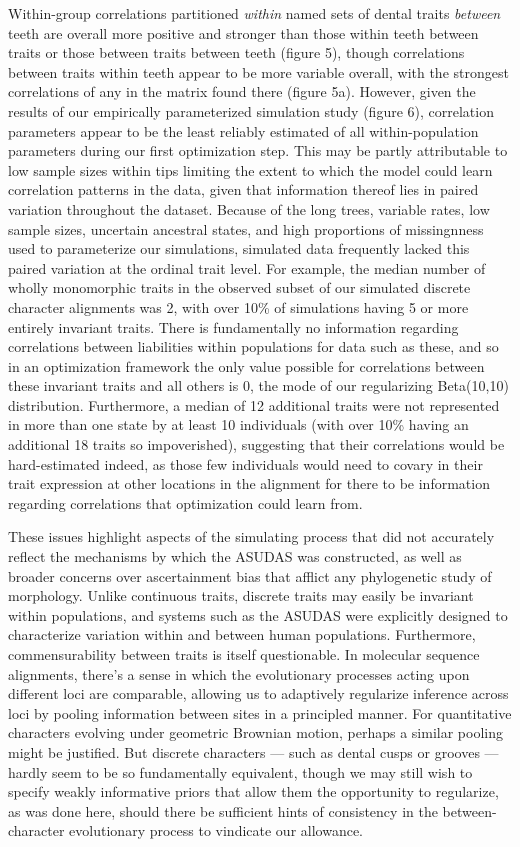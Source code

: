 \documentclass[12pt, twocolumn, twoside]{article}
\begin{document}
Within-group correlations partitioned \textit{within} named sets of dental traits \textit{between} teeth are overall more positive and stronger than those within teeth between traits or those between traits between teeth (figure 5), though correlations between traits within teeth appear to be more variable overall, with the strongest correlations of any in the matrix found there (figure 5a). However, given the results of our empirically parameterized simulation study (figure 6), correlation parameters appear to be the least reliably estimated of all within-population parameters during our first optimization step. This may be partly attributable to low sample sizes within tips limiting the extent to which the model could learn correlation patterns in the data, given that information thereof lies in paired variation throughout the dataset. Because of the long trees, variable rates, low sample sizes, uncertain ancestral states, and high proportions of missingnness used to parameterize our simulations, simulated data frequently lacked this paired variation at the ordinal trait level. For example, the median number of wholly monomorphic traits in the observed subset of our simulated discrete character alignments was 2, with over 10\% of simulations having 5 or more entirely invariant traits. There is fundamentally no information regarding correlations between liabilities within populations for data such as these, and so in an optimization framework the only value possible for correlations between these invariant traits and all others is 0, the mode of our regularizing Beta(10,10) distribution. Furthermore, a median of 12 additional traits were not represented in more than one state by at least 10 individuals (with over 10\% having an additional 18 traits so impoverished), suggesting that their correlations would be hard-estimated indeed, as those few individuals would need to covary in their trait expression at other locations in the alignment for there to be information regarding correlations that optimization could learn from.  

These issues highlight aspects of the simulating process that did not accurately reflect the mechanisms by which the ASUDAS was constructed, as well as broader concerns over ascertainment bias that afflict any phylogenetic study of morphology. Unlike continuous traits, discrete traits may easily be invariant within populations, and systems such as the ASUDAS were explicitly designed to characterize variation within and between human populations. Furthermore, commensurability between traits is itself questionable. In molecular sequence alignments, there's a sense in which the evolutionary processes acting upon different loci are comparable, allowing us to adaptively regularize inference across loci by pooling information between sites in a principled manner. For quantitative characters evolving under geometric Brownian motion, perhaps a similar pooling might be justified. But discrete characters --- such as dental cusps or grooves --- hardly seem to be so fundamentally equivalent, though we may still wish to specify weakly informative priors that allow them the opportunity to regularize, as was done here, should there be sufficient hints of consistency in the between-character evolutionary process to vindicate our allowance.
\end{document}
